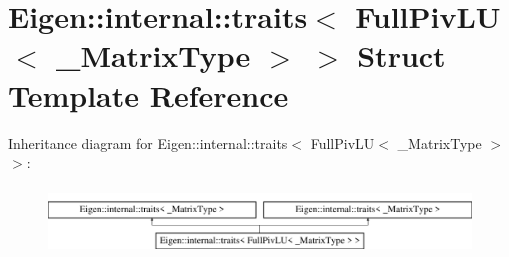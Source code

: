 \hypertarget{struct_eigen_1_1internal_1_1traits_3_01_full_piv_l_u_3_01___matrix_type_01_4_01_4}{}\section{Eigen\+:\+:internal\+:\+:traits$<$ Full\+Piv\+LU$<$ \+\_\+\+Matrix\+Type $>$ $>$ Struct Template Reference}
\label{struct_eigen_1_1internal_1_1traits_3_01_full_piv_l_u_3_01___matrix_type_01_4_01_4}
Inheritance diagram for Eigen\+:\+:internal\+:\+:traits$<$ Full\+Piv\+LU$<$ \+\_\+\+Matrix\+Type $>$ $>$\+:\begin{figure}[H]
\begin{center}
\leavevmode
\includegraphics[height=1.836066cm]{struct_eigen_1_1internal_1_1traits_3_01_full_piv_l_u_3_01___matrix_type_01_4_01_4}
\end{center}
\end{figure}
